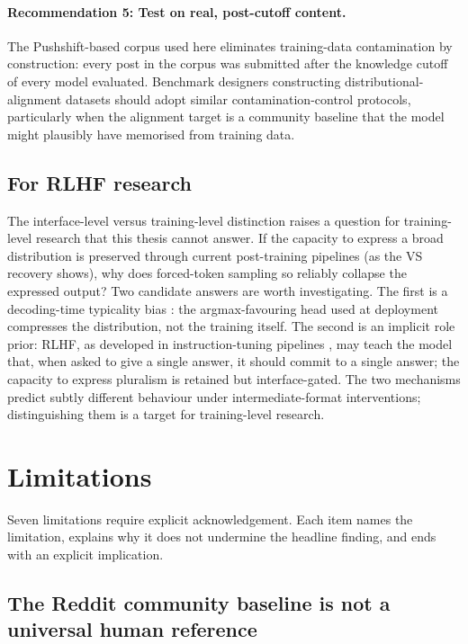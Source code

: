 \paragraph{Recommendation 5: Test on real, post-cutoff content.} The
Pushshift-based corpus used here eliminates training-data contamination
by construction: every post in the corpus was submitted after the
knowledge cutoff of every model evaluated. Benchmark designers
constructing distributional-alignment datasets should adopt similar
contamination-control protocols, particularly when the alignment
target is a community baseline that the model might plausibly have
memorised from training data.

\subsection{For RLHF research}
\label{sec:disc_rlhf}

The interface-level versus training-level distinction raises a
question for training-level research that this thesis cannot answer.
If the capacity to express a broad distribution is preserved through
current post-training pipelines (as the VS recovery shows), why does
forced-token sampling so reliably collapse the expressed output? Two candidate answers are
worth investigating. The first is a decoding-time typicality bias
\citep{zhang-2025-verbalized-sampling}: the argmax-favouring head used
at deployment compresses the distribution, not the training itself.
The second is an implicit role prior: RLHF, as developed in
instruction-tuning pipelines \citep{ouyang-2022-instructgpt}, may
teach the model that, when asked to give a single answer, it should
commit to a single answer; the capacity to express pluralism is
retained but interface-gated. The
two mechanisms predict subtly different behaviour under
intermediate-format interventions; distinguishing them is a target for
training-level research.

\section{Limitations}
\label{sec:disc_limitations}

Seven limitations require explicit acknowledgement. Each item names
the limitation, explains why it does not undermine the headline
finding, and ends with an explicit implication.

\subsection{The Reddit community baseline is not a universal human reference}
\label{sec:disc_lim_reddit}

